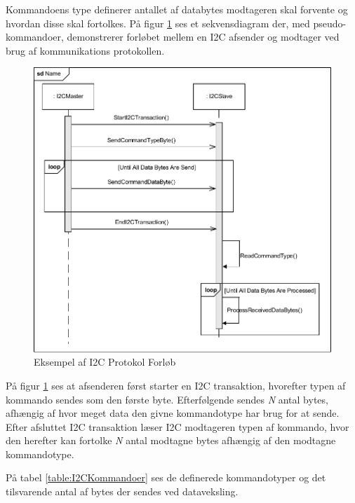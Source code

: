 Kommandoens type definerer antallet af databytes modtageren skal forvente og hvordan disse skal fortolkes. På figur \ref{fig:I2CProtokolEksempel} ses et sekvensdiagram der, med pseudo-kommandoer, demonstrerer forløbet mellem en I2C afsender og modtager ved brug af kommunikations protokollen.

\begin{figure}[H]
	\centering
	\includegraphics[width=\textwidth] {Systemarkitektur/images/I2CProtocol}
	\caption{Eksempel af I2C Protokol Forløb}
	\label{fig:I2CProtokolEksempel}
\end{figure}

På figur \ref{fig:I2CProtokolEksempel} ses at afsenderen først starter en I2C transaktion, hvorefter typen af kommando sendes som den første byte. Efterfølgende sendes \textit{N} antal bytes, afhængig af hvor meget data den givne kommandotype har brug for at sende. Efter afsluttet I2C transaktion læser I2C modtageren typen af kommando, hvor den herefter kan fortolke \textit{N} antal modtagne bytes afhængig af den modtagne kommandotype.

På tabel \ref{table:I2CKommandoer} ses de definerede kommandotyper og det tilsvarende antal af bytes der sendes ved dataveksling.

